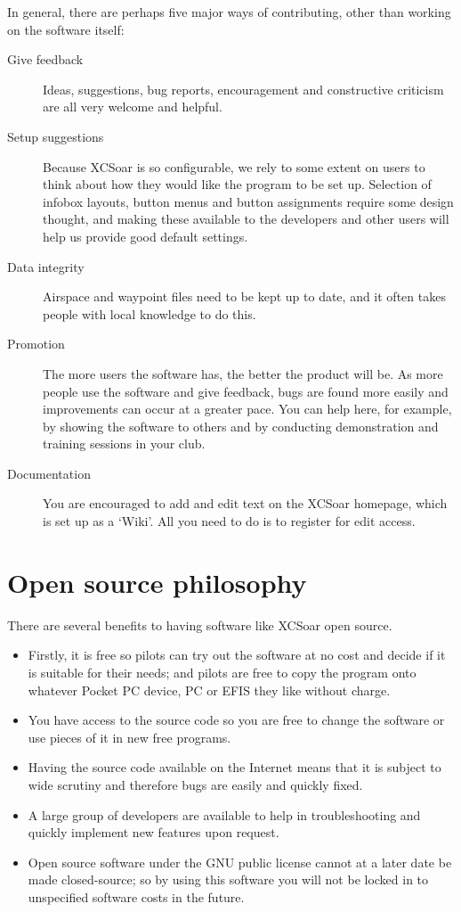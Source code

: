 In general, there are perhaps five major ways of contributing, other
than working on the software itself:
\begin{description}
\item[Give feedback]
Ideas, suggestions, bug reports, encouragement and
constructive criticism are all very welcome and helpful.
\item[Setup suggestions]
Because XCSoar is so configurable, we rely to some extent on users to
think about how they would like the program to be set up.  Selection
of infobox layouts, button menus and button assignments require some
design thought, and making these available to the developers and other
users will help us provide good default settings.
\item[Data integrity]
Airspace and waypoint files need to be kept up to date, and it often
takes people with local knowledge to do this.
\item[Promotion]  The more users the software has, the better
 the product will be.  As more people use the software and give
 feedback, bugs are found more easily and improvements can occur at a
 greater pace.  You can help here, for example, by showing the
 software to others and by conducting demonstration and training
 sessions in your club.
\item[Documentation]  You are encouraged to add and edit text on the
XCSoar homepage, which is set up as a `Wiki'.  All you need to do is
to register for edit access.
\end{description}

\section{Open source philosophy}

There are several benefits to having software like XCSoar open source.

\begin{itemize}
\item Firstly, it is free so pilots can try out the software at no
 cost and decide if it is suitable for their needs; and pilots are free
 to copy the program onto whatever Pocket PC device, PC or EFIS they like
 without charge.
\item You have access to the source code so you are free to change
 the software or use pieces of it in new free programs.
\item Having the source code available on the Internet means that it is
 subject to wide scrutiny and therefore bugs are easily and quickly fixed.
\item A large group of developers are available to help in troubleshooting
 and quickly implement new features upon request.
\item Open source software under the GNU public license cannot at a later
 date be made closed-source; so by using this software you will not be
 locked in to unspecified software costs in the future.
\end{itemize}

